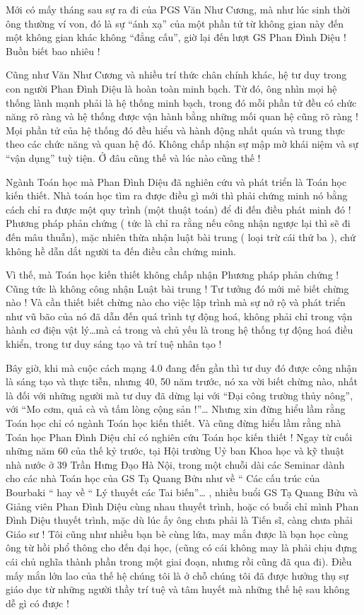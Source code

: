 
Mới có mấy tháng sau sự ra đi của PGS Văn Như Cương, mà như lúc sinh thời ông thường ví von, đó là sự “ánh xạ” của một phần tử  từ không gian này đến một không gian khác không “đẳng cấu”, giờ lại đến lượt GS Phan Đình Diệu ! Buồn biết bao nhiêu !

Cũng như Văn Như Cương và nhiều trí thức chân chính khác, hệ tư duy trong con người Phan Đình Diệu là hoàn toàn minh bạch. Từ đó, ông nhìn mọi hệ thống lành mạnh phải là hệ thống minh bạch, trong đó mỗi phần tử đều có chức năng rõ ràng và hệ thống được vận hành bằng những mối quan hệ cũng rõ ràng ! Mọi phần tử của hệ thống đó đều hiểu và hành động nhất quán và trung thực theo các chức năng và quan hệ đó. 
Không chấp nhận sự mập mờ khái niệm và sự “vận dụng” tuỳ tiện.
Ở đâu cũng thế và lúc nào cũng thế ! 

Ngành Toán học mà Phan Đình Diệu đã nghiên cứu và phát triển là Toán học kiến thiết. Nhà toán học tìm ra được điều gì mới thì phải chứng minh nó bằng cách chỉ ra được một quy trình (một thuật toán) để đi đến điều phát minh đó ! 
Phương pháp phản chứng ( tức là chỉ ra rằng nếu công nhận ngược lại thì sẽ đi đến mâu thuẫn), mặc nhiên thừa nhận luật bài trung ( loại trừ cái thứ ba ), chứ không hề dẫn dắt người ta đến điều cần chứng minh. 

Vì thế, mà Toán học kiến thiết không chấp nhận Phương pháp phản chứng ! Cũng tức là không công nhận Luật bài trung !
Tư tưởng đó mới mẻ biết chừng nào ! Và cần thiết biết chừng nào cho việc lập trình mà sự nở rộ và phát triển như vũ bão của nó đã dẫn đến quá trình tự động hoá, không phải chỉ trong vận hành cơ điện vật lý…mà cả trong và chủ yếu là trong hệ thống tự động hoá điều khiển, trong tư duy sáng tạo và trí tuệ nhân tạo !

Bây giờ, khi mà cuộc cách mạng 4.0 đang đến gần thì tư duy đó được công nhận là  sáng tạo và thực tiễn, nhưng 40, 50 năm trước, nó xa vời biết chừng nào, nhất là đối với những người mà tư duy đã dừng lại với “Đại công trường thủy nông”, với “Mo cơm, quả cà và tấm lòng cộng sản !”…
Nhưng xin đừng hiểu lầm rằng Toán học chỉ có ngành Toán học kiến thiết. Và cũng đừng hiểu lầm rằng nhà Toán học Phan Đình Diệu chỉ có nghiên cứu Toán học kiến thiết !
Ngay từ cuối những năm 60 của thế kỷ trước, tại Hội trường Uỷ ban Khoa học và kỹ thuật nhà nước ở 39 Trần Hưng Đạo Hà Nội, trong một chuỗi dài các Seminar dành cho các nhà Toán học của GS Tạ Quang Bửu như về “ Các cấu trúc của Bourbaki “ hay về “ Lý thuyết các Tai biến”… , nhiều buổi GS Tạ Quang Bửu và Giảng viên Phan Đình Diệu cùng nhau thuyết trình, hoặc có buổi chỉ mình Phan Đình Diệu thuyết trình, mặc dù lúc ấy ông chưa phải là Tiến sĩ, càng chưa phải Giáo sư !
Tôi cũng như nhiều bạn bè cùng lứa, may mắn được là bạn học cùng ông từ hồi phổ thông cho đến đại học, (cũng có cái không may là phải chịu đựng cái chủ nghĩa thành phần trong một giai đoạn, nhưng rồi cũng đã qua đi). Điều mấy mắn lớn lao của thế hệ chúng tôi là ở chỗ chúng tôi đã được hưởng thụ sự giáo dục từ những người thầy trí tuệ và tâm huyết mà những thế hệ sau không dễ gì có được ! 

